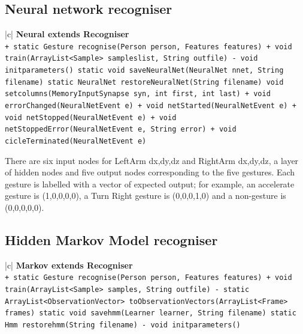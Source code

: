 \documentclass[12pt,a4,notitlepage]{report}
\renewcommand{\_}{\texttt{\symbol{95}}}
\newcommand{\<}{\texttt{\symbol{60}}}
\renewcommand{\>}{\texttt{\symbol{62}}}
\newcommand{\class}[1]{\textbf{#1}}
\newcommand{\variable}[1]{\texttt{#1}}
\begin{document}
\newpage

\subsection{Neural network recogniser}

\begin{tabular}{|c|} \hline 
\class{Neural extends Recogniser} \\ \hline
{}
{ \variable{+ static Gesture recognise(Person person, Features features) \newline
+ void train(ArrayList<Sample> sampleslist, String out\_file) \newline
- void init\_parameters() \newline
static void saveNeuralNet(NeuralNet nnet, String filename) \newline
static NeuralNet restoreNeuralNet(String filename) \newline
void set\_columns(MemoryInputSynapse syn, int first, int last) \newline
+ void errorChanged(NeuralNetEvent e) \newline
+ void netStarted(NeuralNetEvent e) \newline
+ void netStopped(NeuralNetEvent e) \newline
+ void netStoppedError(NeuralNetEvent e, String error) \newline
+ void cicleTerminated(NeuralNetEvent e)
} } \\ \hline
\end{tabular}

There are six input nodes for LeftArm {dx,dy,dz} and RightArm {dx,dy,dz}, a layer of hidden nodes and five output nodes corresponding to the five gestures. Each gesture is labelled with a vector of expected output; for example, an accelerate gesture is (1,0,0,0,0), a Turn Right gesture is (0,0,0,1,0) and a non-gesture is (0,0,0,0,0).

\newpage

\subsection{Hidden Markov Model recogniser}

\begin{tabular}{|c|} \hline 
\class{Markov extends Recogniser} \\ \hline
{}
{ \variable{+ static Gesture recognise(Person person, Features features) \newline
+ void train(ArrayList<Sample> samples, String out\_file) \newline
- static ArrayList<ObservationVector> toObservationVectors(ArrayList<Frame> frames) \newline
static void save\_hmm(Learner learner, String filename) \newline
static Hmm restore\_hmm(String filename) \newline
- void init\_parameters()
} } \\ \hline
\end{tabular}
\end{document}
